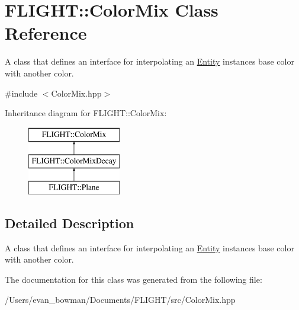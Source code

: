 \hypertarget{class_f_l_i_g_h_t_1_1_color_mix}{}\section{F\+L\+I\+G\+HT\+:\+:Color\+Mix Class Reference}
\label{class_f_l_i_g_h_t_1_1_color_mix}


A class that defines an interface for interpolating an \hyperlink{class_f_l_i_g_h_t_1_1_entity}{Entity} instance\textquotesingle{}s base color with another color.  




{\ttfamily \#include $<$Color\+Mix.\+hpp$>$}

Inheritance diagram for F\+L\+I\+G\+HT\+:\+:Color\+Mix\+:\begin{figure}[H]
\begin{center}
\leavevmode
\includegraphics[height=3.000000cm]{class_f_l_i_g_h_t_1_1_color_mix}
\end{center}
\end{figure}


\subsection{Detailed Description}
A class that defines an interface for interpolating an \hyperlink{class_f_l_i_g_h_t_1_1_entity}{Entity} instance\textquotesingle{}s base color with another color. 

The documentation for this class was generated from the following file\+:\begin{DoxyCompactItemize}
\item 
/\+Users/evan\+\_\+bowman/\+Documents/\+F\+L\+I\+G\+H\+T/src/Color\+Mix.\+hpp\end{DoxyCompactItemize}
